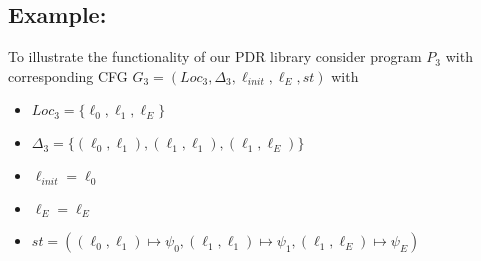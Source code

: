 \documentclass{article}
\begin{document}
	\bigskip
	
	\subsection*{Example:}
	To illustrate the functionality of our PDR library consider program $P_3$ with corresponding CFG $ G_3 = (Loc_3, \Delta_3, \ell_{init}, \ell_E, st) $ with \\ 
	\begin{itemize}
		\item $Loc_3 = \{\ell_0, \ell_1, \ell_E \}$
		\item $\Delta_3 = \{(\ell_0, \ell_1), (\ell_1, \ell_1), (\ell_1, \ell_E) \}$
		\item $\ell_{init} = \ell_0 $
		\item $\ell_E = \ell_E$
		\item $st = ( (\ell_0, \ell_1) \mapsto \psi_0, (\ell_1, \ell_1) \mapsto \psi_1, (\ell_1, \ell_E) \mapsto \psi_E)$
	\end{itemize}
\end{document}
